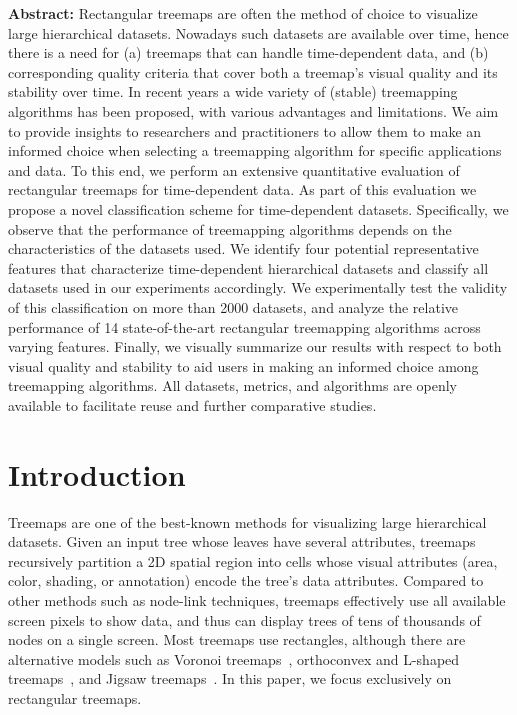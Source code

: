 \vspace{5mm} %


\noindent \textbf{Abstract:}
Rectangular treemaps are often the method of choice to visualize large hierarchical datasets. Nowadays such datasets are available over time, hence there is a need for (a) treemaps that can handle time-dependent data, and (b) corresponding quality criteria that cover both a treemap's visual quality and its stability over time.
%
In recent years a wide variety of (stable) treemapping algorithms has been proposed, with various advantages and limitations. 
We aim to provide insights to researchers and practitioners to allow them to make an informed choice when selecting a treemapping algorithm for specific applications and data. To this end, we perform an extensive quantitative evaluation of rectangular treemaps for time-dependent data.
%
As part of this evaluation we propose a novel classification scheme for time-dependent datasets. Specifically, we observe that the performance of treemapping algorithms depends on the characteristics of the datasets used. We identify four potential representative features that characterize time-dependent hierarchical datasets and classify all datasets used in our experiments accordingly. We experimentally test the validity of this classification on more than 2000 datasets, and analyze the relative performance of 14 state-of-the-art rectangular treemapping algorithms across varying features. Finally, we visually summarize our results with respect to both visual quality and stability to aid users in making an informed choice among treemapping algorithms.
All datasets, metrics, and algorithms are openly available to facilitate reuse and further comparative studies.

\section{Introduction}
\label{sec:introduction}

Treemaps are one of the best-known methods for visualizing large hierarchical datasets. Given an input tree whose leaves have several attributes, treemaps recursively partition a 2D spatial region into cells whose visual attributes (area, color, shading, or annotation) encode the tree's data attributes. Compared to other methods such as node-link techniques, treemaps effectively use all available screen pixels to show data, and thus can display trees of tens of thousands of nodes on a single screen. Most treemaps use rectangles, although there are alternative models such as Voronoi treemaps~\citep{balzer05b}, orthoconvex and L-shaped treemaps~\citep{deberg14}, and Jigsaw treemaps~\citep{jigsaw}. 
In this paper, we focus exclusively on rectangular treemaps.

